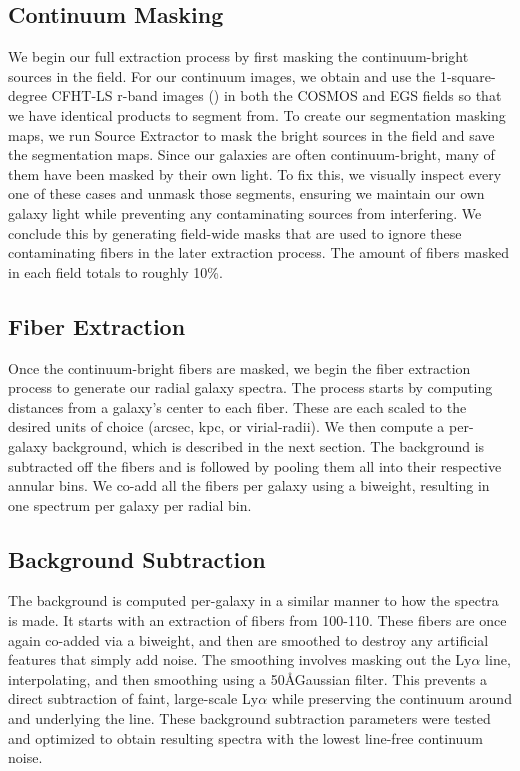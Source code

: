 \documentclass[linenumbers,amsmath,trackchanges,preprint2]{aastex702}
\begin{document}
\subsection{Continuum Masking}
\par We begin our full extraction process by first masking the continuum-bright sources in the field. For our continuum images, we obtain and use the 1-square-degree CFHT-LS r-band images (\cite{cuillandre2012}) in both the COSMOS and EGS fields so that we have identical products to segment from. To create our segmentation masking maps, we run Source Extractor to mask the bright sources in the field and save the segmentation maps. Since our galaxies are often continuum-bright, many of them have been masked by their own light. To fix this, we visually inspect every one of these cases and unmask those segments, ensuring we maintain our own galaxy light while preventing any contaminating sources from interfering. We conclude this by generating field-wide masks that are used to ignore these contaminating fibers in the later extraction process. The amount of fibers masked in each field totals to roughly 10\%. 

\subsection{Fiber Extraction}
\par Once the continuum-bright fibers are masked, we begin the fiber extraction process to generate our radial galaxy spectra. The process starts by computing distances from a galaxy's center to each fiber. These are each scaled to the desired units of choice (arcsec, kpc, or virial-radii). We then compute a per-galaxy background, which is described in the next section. The background is subtracted off the fibers and is followed by pooling them all into their respective annular bins. We co-add all the fibers per galaxy using a biweight, resulting in one spectrum per galaxy per radial bin.

\subsection{Background Subtraction}
\par The background is computed per-galaxy in a similar manner to how the spectra is made. It starts with an extraction of fibers from 100-110\arcsec. These fibers are once again co-added via a biweight, and then are smoothed to destroy any artificial features that simply add noise. The smoothing involves masking out the Ly$\alpha$ line, interpolating, and then smoothing using a 50\AA Gaussian filter. This prevents a direct subtraction of faint, large-scale Ly$\alpha$ while preserving the continuum around and underlying the line. These background subtraction parameters were tested and optimized to obtain  resulting spectra with the lowest line-free continuum noise.
\end{document}
